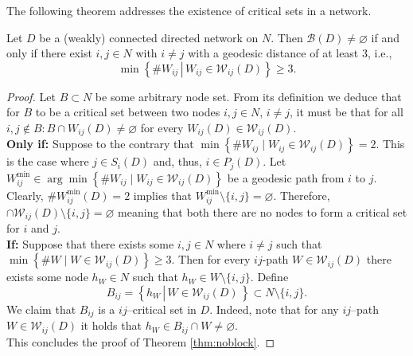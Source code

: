 The following theorem addresses the existence of critical sets in a network.
\begin{theorem} \label{thm:noblock}
Let $D$ be a (weakly) connected directed network on $N$. Then $\mathcal{B} (D) \neq \varnothing $ if and only if there exist $i,j \in N$ with $i \neq j$ with a geodesic distance of at least 3, i.e.,
\begin{equation}
\min \left\{ \left. \# W_{ij} \, \right| \, W_{ij} \in \mathcal{W}_{ij} (D) \right\} \geqslant 3 .
\end{equation}
\end{theorem}
\begin{proof}
Let $B \subset N$ be some arbitrary node set. From its definition we deduce that for $B$ to be a critical set between two nodes $i,j \in N$, $i \neq j$, it must be that for all $i,j \notin B \colon B \cap W_{ij}(D) \neq \varnothing$ for every $W_{ij}(D) \in \mathcal{W}_{ij}(D)$.
\\[1ex]
\textbf{Only if:} Suppose to the contrary that $\min \left\{ \# W_{ij} \mid W_{ij} \in \mathcal{W}_{ij}(D) \right\} = 2$. This is the case where $j \in S_{i}(D)$ and, thus, $i \in P_{j}(D)$. Let $W^{\min}_{ij} \in \arg\min \left\{ \# W_{ij} \mid W_{ij} \in \mathcal{W}_{ij}(D) \right\}$ be a geodesic path from $i$ to $j$. Clearly, $\# W^{\min}_{ij}(D) = 2$ implies that $W_{ij}^{\min} \setminus \{i,j\} = \varnothing$. Therefore, $\cap \mathcal{W}_{ij} (D) \setminus \{ i,j \} = \varnothing$ meaning that both there are no nodes to form a critical set for $i$ and $j$.
\\[1ex]
\textbf{If:} Suppose that there exists some $i,j \in N$ where $i \neq j$ such that $\min \left\{ \#W \mid W \in \mathcal{W}_{ij}(D) \right\} \geqslant 3$. Then for every $ij$-path $W \in \mathcal{W}_{ij} (D)$ there exists some node $h_W \in N$ such that $h_W \in W \setminus \{i,j\}$. Define
\begin{equation}
B_{ij} = \left\{ h_W \, \left| \, W \in \mathcal{W}_{ij} (D) \, \right. \right\} \subset N \setminus \{ i,j \} .
\end{equation}
We claim that $B_{ij}$ is a $ij$--critical set in $D$. Indeed, note that for any $ij$--path $W \in \mathcal{W}_{ij} (D)$ it holds that $h_W \in B_{ij} \cap W \neq \varnothing$.
\\[1ex]
This concludes the proof of Theorem \ref{thm:noblock}.
\end{proof}

